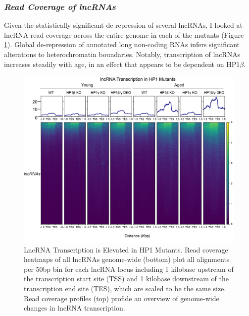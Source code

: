 \documentclass[onehalf,12pt]{beavtex}
\begin{document}
  \FloatBarrier
  \newpage
  
  \subsubsection*{\texorpdfstring{\emph{Read Coverage of
  lncRNAs}}{Read Coverage of lncRNAs}}\label{read-coverage-of-lncrnas}
  
  Given the statistically significant de-repression of several lncRNAs, I
  looked at lncRNA read coverage across the entire genome in each of the
  mutants (Figure \ref{fig:lncRNAcov}). Global de-repression of annotated
  long non-coding RNAs infers significant alterations to heterochromatin
  boundaries. Notably, transcription of lncRNAs increases steadily with
  age, in an effect that appears to be dependent on HP1\(\beta\).
  
  \begin{figure}
  
  {\centering \includegraphics[width=1\linewidth, ]{./figure/results/lncRNACov} 
  
  }
  
  \caption[LncRNA transcription is elevated in HP1 Mutants]{LncRNA Transcription is Elevated in HP1 Mutants.  Read coverage heatmaps of all lncRNAs genome-wide (bottom) plot all alignments per 50bp bin for each lncRNA locus including 1 kilobase upstream of the transcription start site (TSS) and 1 kilobase downstream of the transcription end site (TES), which are scaled to be the same size.  Read coverage profiles (top) profide an overview of genome-wide changes in lncRNA transcription.}\label{fig:lncRNAcov}
  \end{figure}
  
\end{document}
